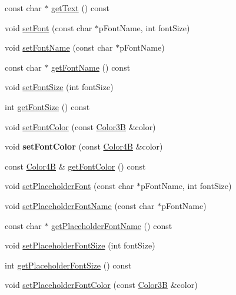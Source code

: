 \begin{DoxyCompactItemize}
const char $\ast$ \hyperlink{classui_1_1EditBox_a78d728fb111be80c389ec266382e91cc}{get\+Text} () const
\item 
void \hyperlink{classui_1_1EditBox_a08931a6b6fde6d4e4365204beb3af43d}{set\+Font} (const char $\ast$p\+Font\+Name, int font\+Size)
\item 
void \hyperlink{classui_1_1EditBox_a1070042cf20467ff429d93285a592204}{set\+Font\+Name} (const char $\ast$p\+Font\+Name)
\item 
const char $\ast$ \hyperlink{classui_1_1EditBox_a451027736ac41aa82930bdd05e8602c2}{get\+Font\+Name} () const
\item 
void \hyperlink{classui_1_1EditBox_a92dda35f7efd5779f63dd70fa7f86686}{set\+Font\+Size} (int font\+Size)
\item 
int \hyperlink{classui_1_1EditBox_a815da9992ba29b9b50a6d9acd84006eb}{get\+Font\+Size} () const
\item 
void \hyperlink{classui_1_1EditBox_a5dd7dcc5252cdb08ef9f0a15238df0dd}{set\+Font\+Color} (const \hyperlink{structColor3B}{Color3B} \&color)
\item 
\mbox{\label{classui_1_1EditBox_acd7aa1527813c463ab4bbb955ba8d528}} 
void {\bfseries set\+Font\+Color} (const \hyperlink{structColor4B}{Color4B} \&color)
\item 
const \hyperlink{structColor4B}{Color4B} \& \hyperlink{classui_1_1EditBox_aa8acef6afc41d2dadd4f1985a3d18231}{get\+Font\+Color} () const
\item 
void \hyperlink{classui_1_1EditBox_a19ef30f768dcf5d67808e0e67b7809b9}{set\+Placeholder\+Font} (const char $\ast$p\+Font\+Name, int font\+Size)
\item 
void \hyperlink{classui_1_1EditBox_a7d5130331ff087d3b0544cac2939a55b}{set\+Placeholder\+Font\+Name} (const char $\ast$p\+Font\+Name)
\item 
const char $\ast$ \hyperlink{classui_1_1EditBox_a10aa107d97c44e21733615e777e2ba4c}{get\+Placeholder\+Font\+Name} () const
\item 
void \hyperlink{classui_1_1EditBox_a8460f548f82512af8286b384a8c8bcab}{set\+Placeholder\+Font\+Size} (int font\+Size)
\item 
int \hyperlink{classui_1_1EditBox_aa50880b73279ba99aa23239250421e9c}{get\+Placeholder\+Font\+Size} () const
\item 
void \hyperlink{classui_1_1EditBox_a84cdeb802d3ab4e78c036d49a2ffefed}{set\+Placeholder\+Font\+Color} (const \hyperlink{structColor3B}{Color3B} \&color)
\item 

\end{DoxyCompactItemize}
